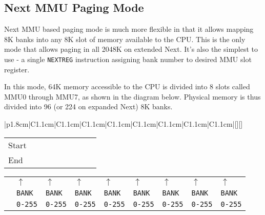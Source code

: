 \pagebreak
\subsection{Next MMU Paging Mode}

Next MMU based paging mode is much more flexible in that it allows mapping 8K banks into any 8K slot of memory available to the CPU. This is the only mode that allows paging in all 2048K on extended Next. It's also the simplest to use - a single {\tt NEXTREG} instruction assigning bank number to desired MMU slot register.

In this mode, 64K memory accessible to the CPU is divided into 8 slots called MMU0 through MMU7, as shown in the diagram below. Physical memory is thus divided into 96 (or 224 on expanded Next) 8K banks.

\begin{ElegantTable}{|p{1.8cm}|C{1.1cm}|C{1.1cm}|C{1.1cm}|C{1.1cm}|C{1.1cm}|C{1.1cm}|C{1.1cm}|C{1.1cm}|}[][]
\end{ElegantTable}

\vspace*{-0.75em}

\begin{tabular}{|p{1.8cm}|C{1.1cm}|C{1.1cm}|C{1.1cm}|C{1.1cm}|C{1.1cm}|C{1.1cm}|C{1.1cm}|C{1.1cm}|}
	\hline
	Start	& 	& 	& 	& 	& 	& 	& 	&  \\
	End		& 	& 	& 	& 	& 	& 	& 	&  \\
	\hline
\end{tabular}

\vspace*{-0.7em}

\begin{tabular}{p{1.8cm}C{1.1cm}C{1.1cm}C{1.1cm}C{1.1cm}C{1.1cm}C{1.1cm}C{1.1cm}C{1.1cm}}
			& $\uparrow$		& $\uparrow$		& $\uparrow$		& $\uparrow$		& $\uparrow$		& $\uparrow$		& $\uparrow$		& $\uparrow$ \\
			& {\tt BANK}		& {\tt BANK}		& {\tt BANK}		& {\tt BANK}		& {\tt BANK}		& {\tt BANK}		& {\tt BANK}		& {\tt BANK} \\
			& {\tt 0-255}		& {\tt 0-255}		& {\tt 0-255}		& {\tt 0-255}		& {\tt 0-255}		& {\tt 0-255}		& {\tt 0-255}		& {\tt 0-255} \\
\end{tabular}

